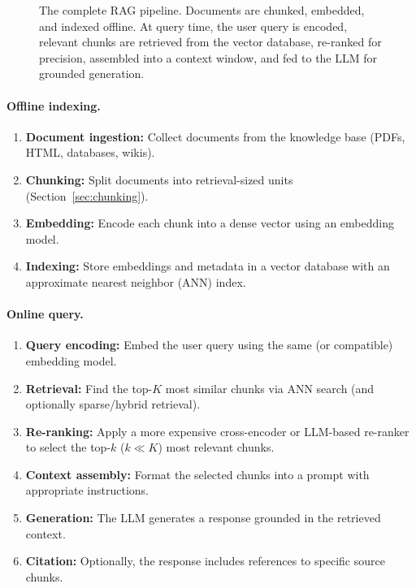 \begin{figure}[H]
\caption{The complete RAG pipeline.  Documents are chunked, embedded, and
indexed offline.  At query time, the user query is encoded, relevant chunks
are retrieved from the vector database, re-ranked for precision, assembled
into a context window, and fed to the LLM for grounded generation.}
\label{fig:rag-pipeline}
\end{figure}

\paragraph{Offline indexing.}
\begin{enumerate}
    \item \textbf{Document ingestion:} Collect documents from the knowledge
          base (PDFs, HTML, databases, wikis).
    \item \textbf{Chunking:} Split documents into retrieval-sized units
          (Section~\ref{sec:chunking}).
    \item \textbf{Embedding:} Encode each chunk into a dense vector using an
          embedding model.
    \item \textbf{Indexing:} Store embeddings and metadata in a vector database
          with an approximate nearest neighbor (ANN) index.
\end{enumerate}

\paragraph{Online query.}
\begin{enumerate}
    \item \textbf{Query encoding:} Embed the user query using the same (or
          compatible) embedding model.
    \item \textbf{Retrieval:} Find the top-$K$ most similar chunks via ANN
          search (and optionally sparse/hybrid retrieval).
    \item \textbf{Re-ranking:} Apply a more expensive cross-encoder or
          LLM-based re-ranker to select the top-$k$ ($k \ll K$) most
          relevant chunks.
    \item \textbf{Context assembly:} Format the selected chunks into a prompt
          with appropriate instructions.
    \item \textbf{Generation:} The LLM generates a response grounded in the
          retrieved context.
    \item \textbf{Citation:} Optionally, the response includes references to
          specific source chunks.
\end{enumerate}

